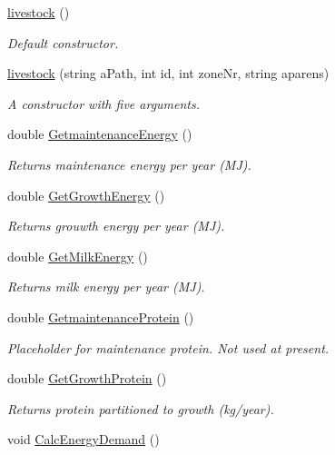 \begin{DoxyCompactItemize}
\mbox{\hyperlink{classlivestock_a0f351330e7211a1c52533fb79f37ac3d}{livestock}} ()
\begin{DoxyCompactList}\small\item\em Default constructor. \end{DoxyCompactList}\item 
\mbox{\hyperlink{classlivestock_a1fde1733d76ceeb2b4337ded5580aa7a}{livestock}} (string a\+Path, int id, int zone\+Nr, string aparens)
\begin{DoxyCompactList}\small\item\em A constructor with five arguments. \end{DoxyCompactList}\item 
double \mbox{\hyperlink{classlivestock_a95f8f38c956fbaa68522def23741e9c3}{Getmaintenance\+Energy}} ()
\begin{DoxyCompactList}\small\item\em Returns maintenance energy per year (MJ). \end{DoxyCompactList}\item 
double \mbox{\hyperlink{classlivestock_a4a18f5cfcedb2990257d0f50a0440bd8}{Get\+Growth\+Energy}} ()
\begin{DoxyCompactList}\small\item\em Returns grouwth energy per year (MJ). \end{DoxyCompactList}\item 
double \mbox{\hyperlink{classlivestock_a3769db690d5b53d96e92a5497b17bcd2}{Get\+Milk\+Energy}} ()
\begin{DoxyCompactList}\small\item\em Returns milk energy per year (MJ). \end{DoxyCompactList}\item 
double \mbox{\hyperlink{classlivestock_ac5ae828f82a2dd6ec59eca8c6a56d774}{Getmaintenance\+Protein}} ()
\begin{DoxyCompactList}\small\item\em Placeholder for maintenance protein. Not used at present. \end{DoxyCompactList}\item 
double \mbox{\hyperlink{classlivestock_a041d8fd0f88b5c6c017135632867efc5}{Get\+Growth\+Protein}} ()
\begin{DoxyCompactList}\small\item\em Returns protein partitioned to growth (kg/year). \end{DoxyCompactList}\item 
void \mbox{\hyperlink{classlivestock_a142934fcc1a5d7e48f4a6c0d0ade892d}{Calc\+Energy\+Demand}} ()

\end{DoxyCompactItemize}
